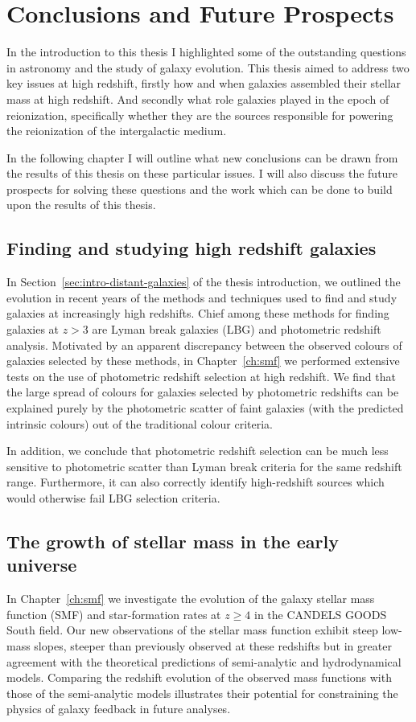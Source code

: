 \chapter{Conclusions and Future Prospects}\label{ch:conclusion}

In the introduction to this thesis I highlighted some of the outstanding questions in astronomy and the study of galaxy evolution. This thesis aimed to address two key issues at high redshift, firstly how and when galaxies assembled their stellar mass at high redshift. And secondly what role galaxies played in the epoch of reionization, specifically whether they are the sources responsible for powering the reionization of the intergalactic medium. 

In the following chapter I will outline what new conclusions can be drawn from the results of this thesis on these particular issues. I will also discuss the future prospects for solving these questions and the work which can be done to build upon the results of this thesis.

\section{Finding and studying high redshift galaxies}
In Section~\ref{sec:intro-distant-galaxies} of the thesis introduction, we outlined the evolution in recent years of the methods and techniques used to find and study galaxies at increasingly high redshifts. Chief among these methods for finding galaxies at $z>3$ are Lyman break galaxies (LBG) and photometric redshift analysis. Motivated by an apparent discrepancy between the observed colours of galaxies selected by these methods, in Chapter~\ref{ch:smf} we performed extensive tests on the use of photometric redshift selection at high redshift. We find that the large spread of colours for galaxies selected by photometric redshifts can be explained purely by the photometric scatter of faint galaxies (with the predicted intrinsic colours) out of the traditional colour criteria.

In addition, we conclude that photometric redshift selection can be much less sensitive to photometric scatter than Lyman break criteria for the same redshift range. Furthermore, it can also correctly identify high-redshift sources which would otherwise fail LBG selection criteria.

\section{The growth of stellar mass in the early universe}
In Chapter~\ref{ch:smf} we investigate the evolution of the galaxy stellar mass function (SMF) and star-formation rates at $z \geq 4$ in the CANDELS GOODS South field. Our new observations of the stellar mass function exhibit steep low-mass slopes, steeper than previously observed at these redshifts but in greater agreement with the theoretical predictions of semi-analytic and hydrodynamical models. Comparing the redshift evolution of the observed mass functions with those of the semi-analytic models illustrates their potential for constraining the physics of galaxy feedback in future analyses.

